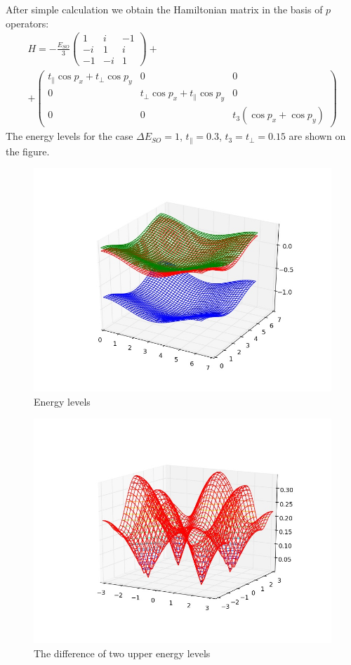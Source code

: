 After simple calculation we obtain the Hamiltonian matrix in the basis of $p$ operators:
\begin{multline}
	H = -\frac{E_{SO}}{3}
		\left(\begin{matrix}
			1 & i & -1 \\
			-i & 1 & i \\
			-1 & -i & 1
		\end{matrix} \right)
		+\\
		+\left(\begin{matrix}
			t_{\parallel} \cos{p_x} + t_{\perp} \cos{p_y} & 0 & 0 \\
			0 &  t_{\perp} \cos{p_x} + t_{\parallel} \cos{p_y} & 0 \\
			0 & 0 &  t_{3} (\cos{p_x} + \cos{p_y}) 
		\end{matrix} \right)
\end{multline}
The energy levels for the case $\Delta E_{SO} = 1$, $t_{\parallel} = 0.3$, $t_3 = t_{\perp} = 0.15$ 
are shown on the figure.
\begin{figure}[h]
	\centering
	\includegraphics[width=0.6\linewidth]{levels.jpg}
	\caption{Energy levels}
\end{figure}
\begin{figure}[h]
	\centering
	\includegraphics[width=0.6\linewidth]{diff_levels.jpg}
	\caption{The difference of two upper energy levels}
\end{figure}

